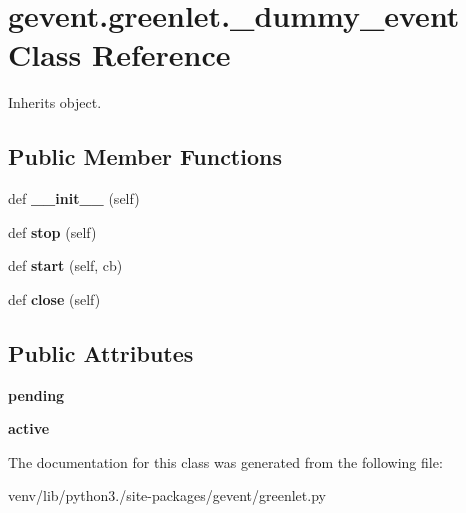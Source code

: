 \hypertarget{classgevent_1_1greenlet_1_1__dummy__event}{}\section{gevent.\+greenlet.\+\_\+dummy\+\_\+event Class Reference}
\label{classgevent_1_1greenlet_1_1__dummy__event}


Inherits object.

\subsection*{Public Member Functions}
\begin{DoxyCompactItemize}
\item 
\mbox{\label{classgevent_1_1greenlet_1_1__dummy__event_a047950ba4cc89dfe2f97d9ef303fa7af}} 
def {\bfseries \+\_\+\+\_\+init\+\_\+\+\_\+} (self)
\item 
\mbox{\label{classgevent_1_1greenlet_1_1__dummy__event_a2dc4d917f4e15003ee381db7bd3e5b8c}} 
def {\bfseries stop} (self)
\item 
\mbox{\label{classgevent_1_1greenlet_1_1__dummy__event_a6beda61f8c4e6d23cbc2357b3720655c}} 
def {\bfseries start} (self, cb)
\item 
\mbox{\label{classgevent_1_1greenlet_1_1__dummy__event_ad91c171a16729b8231133dd44997ba2b}} 
def {\bfseries close} (self)
\end{DoxyCompactItemize}
\subsection*{Public Attributes}
\begin{DoxyCompactItemize}
\item 
\mbox{\label{classgevent_1_1greenlet_1_1__dummy__event_a4ceb9f30e947f16082c9a351291ac16a}} 
{\bfseries pending}
\item 
\mbox{\label{classgevent_1_1greenlet_1_1__dummy__event_a0ea14baf7fa9d75444c1e47d7c549066}} 
{\bfseries active}
\end{DoxyCompactItemize}


The documentation for this class was generated from the following file\+:\begin{DoxyCompactItemize}
\item 
venv/lib/python3./site-\/packages/gevent/greenlet.\+py\end{DoxyCompactItemize}
